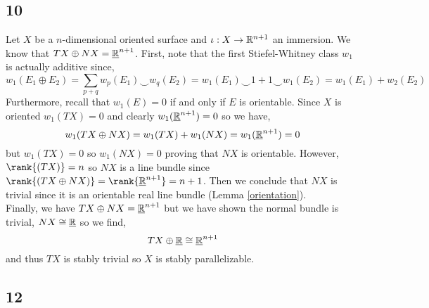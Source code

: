 \documentclass[12pt]{extarticle}
\begin{document}
\subsection{10}

Let $X$ be a $n$-dimensional oriented surface and $\iota : X \to \mathbb{R}^{n+1}$ an immersion. We know that $TX \oplus N X = \underline{\mathbb{R}}^{n+1}$. First, note that the first Stiefel-Whitney class $w_1$ is actually additive since,
\[ w_1(E_1 \oplus E_2) = \sum_{p + q} w_p(E_1) \smile w_q(E_2) = w_1(E_1) \smile 1 + 1 \smile w_1(E_2) = w_1(E_1) + w_2(E_2) \]
Furthermore, recall that $w_1(E) = 0$ if and only if $E$ is orientable. Since $X$ is oriented $w_1(TX) = 0$ and clearly $w_1(\underline{\mathbb{R}}^{n+1}) = 0$ so we have,
\[ w_1(T X \oplus N X) = w_1(TX) + w_1(NX) = w_1(\underline{\mathbb{R}}^{n+1}) = 0 \]
but $w_1(TX) = 0$ so $w_1(NX) = 0$ proving that $NX$ is orientable. However, $\rank{(TX)} = n$ so $NX$ is a line bundle since $\rank{(TX \oplus NX)} = \rank{\underline{\R}^{n+1}} = n+1$. Then we conclude that $NX$ is trivial since it is an orientable real line bundle (Lemma \ref{orientation}). 
\bigskip\\
Finally, we have $TX \oplus N X = \underline{\mathbb{R}}^{n+1}$ but we have shown the normal bundle is trivial, $N X \cong \underline{\mathbb{R}}$ so we find,
\[ TX \oplus \underline{\mathbb{R}} \cong \underline{\mathbb{R}}^{n+1} \]
and thus $TX$ is stably trivial so $X$ is stably parallelizable. 

\subsection{12}
\end{document}
